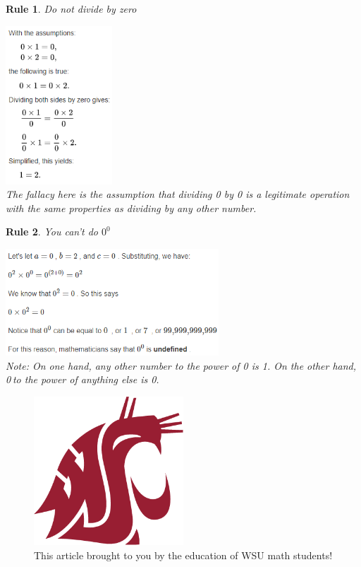 \documentclass{article}
\newtheorem{Rules}{Rule}
\newcounter{ex}[section]
\numberwithin{ex}{section}
\begin{document}
	\newpage
	
	
	\begin{Rules}{Do not divide by zero}
		\begin{center}
				
			\includegraphics[width=0.3\textwidth]{rule1} \\
			The fallacy here is the assumption that dividing 0 by 0 is a legitimate operation with the same properties as dividing by any other number.	
				
		\end{center}
	\end{Rules}

	\begin{Rules}{You can't do $0^0$}
		\begin{center}
				
			\includegraphics[width=0.6\textwidth]{rule2} \\
			Note: On one hand, any other number to the power of 0 is 1. On the other hand, 0 to the power of anything else is 0. 
			
		\end{center}
	\end{Rules}

	\begin{figure}[p] %
		\centering %
		\includegraphics[width=0.5\textwidth]{coug}
		\caption{\label{Coug Logo}This article brought to you by the education of WSU math students!}	
	\end{figure} 
\end{document}
